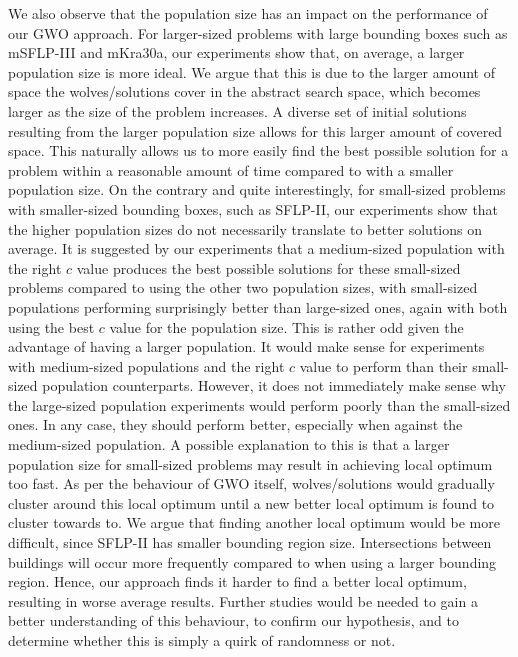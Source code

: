 We also observe that the population size has an impact on the performance of our GWO approach. For larger-sized problems with large bounding boxes such as mSFLP-III and mKra30a, our experiments show that, on average, a larger population size is more ideal. We argue that this is due to the larger amount of space the wolves/solutions cover in the abstract search space, which becomes larger as the size of the problem increases. A diverse set of initial solutions resulting from the larger population size allows for this larger amount of covered space. This naturally allows us to more easily find the best possible solution for a problem within a reasonable amount of time compared to with a smaller population size. On the contrary and quite interestingly, for small-sized problems with smaller-sized bounding boxes, such as SFLP-II, our experiments show that the higher population sizes do not necessarily translate to better solutions on average. It is suggested by our experiments that a medium-sized population with the right $c$ value produces the best possible solutions for these small-sized problems compared to using the other two population sizes, with small-sized populations performing surprisingly better than large-sized ones, again with both using the best $c$ value for the population size. This is rather odd given the advantage of having a larger population. It would make sense for experiments with medium-sized populations and the right $c$ value to perform than their small-sized population counterparts. However, it does not immediately make sense why the large-sized population experiments would perform poorly than the small-sized ones. In any case, they should perform better, especially when against the medium-sized population. A possible explanation to this is that a larger population size for small-sized problems may result in achieving local optimum too fast. As per the behaviour of GWO itself, wolves/solutions would gradually cluster around this local optimum until a new better local optimum is found to cluster towards to. We argue that finding another local optimum would be more difficult, since SFLP-II has smaller bounding region size. Intersections between buildings will occur more frequently compared to when using a larger bounding region. Hence, our approach finds it harder to find a better local optimum, resulting in worse average results. Further studies would be needed to gain a better understanding of this behaviour, to confirm our hypothesis, and to determine whether this is simply a quirk of randomness or not.

